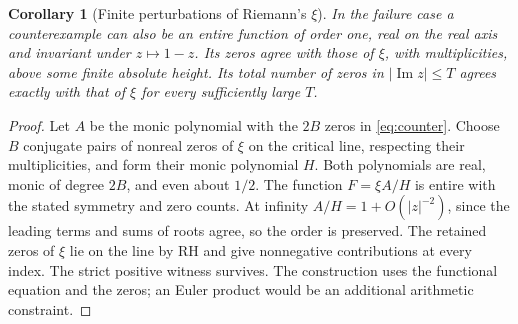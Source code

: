 \documentclass[11pt,letterpaper]{article}
\newtheorem{corollary}[theorem]{Corollary}
\newcommand{\Ima}{\operatorname{Im}}
\begin{document}
\begin{corollary}[Finite perturbations of Riemann's \(\xi\)]\label{cor:xi}
In the failure case a counterexample can also be an entire function of order one, real on the real axis and invariant under \(z\mapsto1-z\). Its zeros agree with those of \(\xi\), with multiplicities, above some finite absolute height. Its total number of zeros in \(|\Ima z|\le T\) agrees exactly with that of \(\xi\) for every sufficiently large \(T\).
\end{corollary}
\begin{proof}
Let \(A\) be the monic polynomial with the \(2B\) zeros in \eqref{eq:counter}. Choose \(B\) conjugate pairs of nonreal zeros of \(\xi\) on the critical line, respecting their multiplicities, and form their monic polynomial \(H\). Both polynomials are real, monic of degree \(2B\), and even about \(1/2\). The function \(F=\xi A/H\) is entire with the stated symmetry and zero counts. At infinity \(A/H=1+O(|z|^{-2})\), since the leading terms and sums of roots agree, so the order is preserved. The retained zeros of \(\xi\) lie on the line by RH and give nonnegative contributions at every index. The strict positive witness survives. The construction uses the functional equation and the zeros; an Euler product would be an additional arithmetic constraint.
\end{proof}
\end{document}
